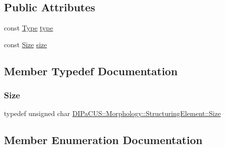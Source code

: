\subsection*{Public Attributes}
\begin{DoxyCompactItemize}
\item 
const \mbox{\hyperlink{structDIPaCUS_1_1Morphology_1_1StructuringElement_a266d1fadc80f8b6ead0b9a38046db1a9}{Type}} \mbox{\hyperlink{structDIPaCUS_1_1Morphology_1_1StructuringElement_aea9961571fdde31c048b2b1bd59f296a}{type}}
\item 
const \mbox{\hyperlink{structDIPaCUS_1_1Morphology_1_1StructuringElement_ab516593fb61afbb06be48f756af85b56}{Size}} \mbox{\hyperlink{structDIPaCUS_1_1Morphology_1_1StructuringElement_ade1c5c9095630d3f404a75b97f1ae825}{size}}
\end{DoxyCompactItemize}


\subsection{Member Typedef Documentation}
\mbox{\label{structDIPaCUS_1_1Morphology_1_1StructuringElement_ab516593fb61afbb06be48f756af85b56}} 
\subsubsection{\texorpdfstring{Size}{Size}}
{\footnotesize\ttfamily typedef unsigned char \mbox{\hyperlink{structDIPaCUS_1_1Morphology_1_1StructuringElement_ab516593fb61afbb06be48f756af85b56}{D\+I\+Pa\+C\+U\+S\+::\+Morphology\+::\+Structuring\+Element\+::\+Size}}}



\subsection{Member Enumeration Documentation}
\mbox{\label{structDIPaCUS_1_1Morphology_1_1StructuringElement_a266d1fadc80f8b6ead0b9a38046db1a9}} 
